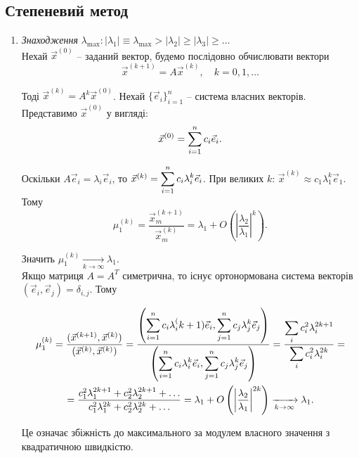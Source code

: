 \subsection{Степеневий метод}
\begin{enumerate}
	\item \textit{Знаходження} $\lambda_{\max}: |\lambda_1|\equiv\lambda_{\max}> |\lambda_2| \ge |\lambda_3| \ge \ldots$ \\

	Нехай $\vec x^{(0)}$ -- заданий вектор, будемо послідовно обчислювати вектори
	\begin{equation}
		\label{eq:5.2}
		\vec x^{(k+1)} = A \vec x^{(k)}, \quad k = 0, 1, \ldots
	\end{equation}

	Тоді $\vec x^{(k)} = A^k \vec x^{(0)}$. Нехай $\{\vec e_i\}_{i=1}^n$ -- система власних векторів. Представимо $\vec x^{(0)}$ у вигляді: \[ \vec x^{(0)} = \displaystyle\sum\limits_{i=1}^n c_i \vec e_i. \]

	Оскільки $A \vec e_i = \lambda_i \vec e_i$, то $\vec x^{(k)} = \displaystyle\sum\limits_{i=1}^n c_i \lambda_i^k \vec e_i$. При великих $k$: $\vec x^{(k)} \approx c_1 \lambda_1^k \vec e_1$. Тому \[ \mu_1^{(k)} = \dfrac{\vec x_m^{(k+1)}}{\vec x_m^{(k)}} = \lambda_1 + O \left( \left| \dfrac{\lambda_2}{\lambda_1} \right|^k \right). \]

	Значить $\mu_1^{(k)} \xrightarrow[k\to\infty]{} \lambda_1$. \\

	Якщо матриця $A = A^T$ симетрична, то існує ортонормована система векторів $(\vec e_i, \vec e_j) = \delta_{i,j}$. Тому

	\begin{multline*}
		\mu_1^{(k)} = \dfrac{(\vec x^{(k+1)}, \vec x^{(k)})}{(\vec x^{(k)}, \vec x^{(k)})} = \dfrac{\left(\displaystyle\sum\limits_{i=1}^n c_i \lambda_i^(k+1) \vec e_i,\displaystyle\sum\limits_{j=1}^n c_j \lambda_j^k \vec e_j\right)}{\left(\displaystyle\sum\limits_{i=1}^n c_i \lambda_i^k \vec e_i,\displaystyle\sum\limits_{j=1}^n c_j \lambda_j^k \vec e_j\right)} = \dfrac{\displaystyle\sum\limits_i c_i^2 \lambda_i^{2k+1}}{\displaystyle\sum\limits_i c_i^2 \lambda_i^{2k}} = \\
		= \dfrac{c_1^2\lambda_1^{2k+1}+c_2^2\lambda_2^{2k+1}+\ldots}{c_1^2\lambda_1^{2k}+c_2^2\lambda_2^{2k}+\ldots} = \lambda_1 + O \left( \left| \dfrac{\lambda_2}{\lambda_1} \right|^{2k} \right) \xrightarrow[k\to\infty]{} \lambda_1.
	\end{multline*}

	Це означає збіжність до максимального за модулем власного значення з квадратичною швидкістю.\\


\end{enumerate}
